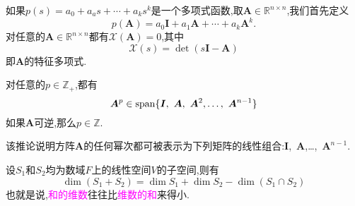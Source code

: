 \documentclass[cn,10pt,citestyle=gb7714-2015,bibstyle=gb7714-2015]{elegantbook}
\begin{document}
\begin{theorem}\label{thm:Carley-Hamilton}
  如果$p(s)=a_0+a_as+\cdots+a_ks^k$是一个多项式函数,取$\bm{A}\in\mathbb{R}^{n\times n}$,我们首先定义
  \[
    p(\bm{A})=a_0\bm{I}+a_1\bm{A}+\cdots+a_k\bm{A}^k.
  \]
  对任意的$\bm{A}\in\mathbb{R}^{n\times n}$都有$\mathcal{X}(\bm{A})=0$,其中
  \[
    \mathcal{X}(s)=\det(s\bm{I}-\bm{A})
  \]
  即$\bm{A}$的特征多项式.
\end{theorem}
\begin{corollary}\label{cor:corollary-for-C-H-theorem}
  对任意的$p\in\mathbb{Z}_+$,都有
  \[
    \bm{A}^p\in\textup{span}\{\bm{I},\ \bm{A},\ \bm{A}^2,\ldots,\ \bm{A}^{n-1}\}
  \]
  如果$\bm{A}$可逆,那么$p\in\mathbb{Z}$.

  该推论说明方阵$\bm{A}$的任何幂次都可被表示为下列矩阵的线性组合:$\bm{I}$,\ $\bm{A}$,\ldots,\ $\bm{A}^{n-1}$.
\end{corollary}
\begin{theorem}[维数定理]\label{thm:vector-four-conclusions}
  设$S_1$和$S_2$均为数域$F$上的线性空间$V$的子空间,则有
  \begin{equation}
    \dim(S_1+S_2)=\dim S_1+\dim S_2-\dim(S_1\cap S_2)
  \end{equation}
  也就是说,\textcolor{magenta}{和的维数}往往比\textcolor{magenta}{维数的和}来得小.
\end{theorem}
\end{document}
